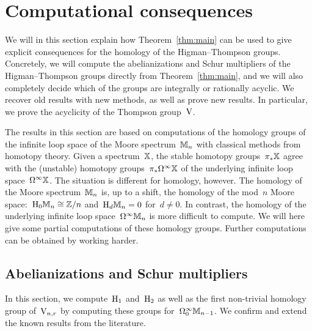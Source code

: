 

\section{Computational consequences}\label{sec:explicit}

We will in this section explain how Theorem~\ref{thm:main} can be used to give explicit consequences for the homology of the Higman--Thompson groups. Concretely, we will compute the abelianizations and Schur multipliers of the Higman--Thompson groups directly from Theorem~\ref{thm:main}, and we will also completely decide which of the groups are integrally or rationally acyclic. We recover old results with new methods, as well as prove new results. In particular, we prove the acyclicity of the Thompson group~$\mathrm{V}$. 

The results in this section are based on computations of the homology groups of the infinite loop space of the Moore spectrum~$\mathbb{M}_{n}$ with classical methods from homotopy theory. Given a spectrum~$\mathbb{X}$, the stable homotopy groups~$\pi_*\mathbb{X}$ agree with the (unstable) homotopy groups~$\pi_*\Omega^\infty\mathbb{X}$ of the underlying infinite loop space~$\Omega^\infty\mathbb{X}$. The situation is different for homology, however. The homology of the Moore spectrum~$\mathbb{M}_n$ is, up to a shift, the homology of the mod~$n$ Moore space:~$\mathrm{H}_0\mathbb{M}_n\cong\mathbb{Z}/n$ and~$\mathrm{H}_d\mathbb{M}_n=0$ for~$d\not=0$. In contrast, the homology of the underlying infinite loop space~$\Omega^\infty\mathbb{M}_n$ is more difficult to compute. We will here give some partial computations of these homology groups. Further computations can be obtained by working harder. 


\subsection{Abelianizations and Schur multipliers}


In this section, we compute~$\mathrm{H}_1$ and~$\mathrm{H}_2$ as well as the first non-trivial homology group of~$\mathrm{V}_{n,r}$  by computing these groups for~$\Omega_0^\infty\mathbb{M}_{n-1}$. We confirm and extend the known results from the literature.

